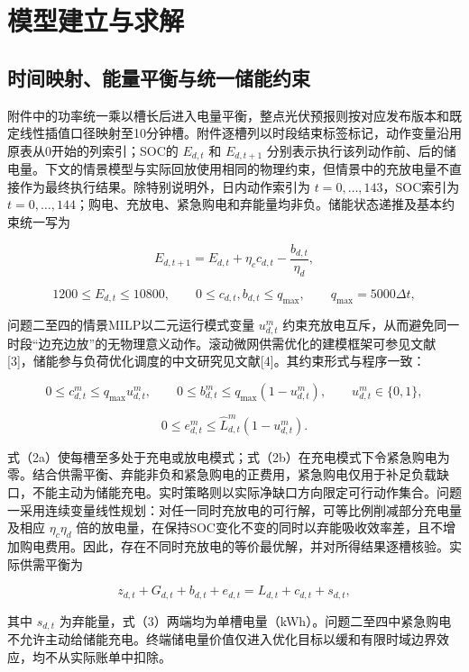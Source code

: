 \documentclass[zihao=-4,a4paper,UTF8,fontset=none]{ctexart}
\begin{document}
\section{模型建立与求解}\label{ux6a21ux578bux5efaux7acbux4e0eux6c42ux89e3}

\subsection{时间映射、能量平衡与统一储能约束}\label{ux65f6ux95f4ux6620ux5c04ux80fdux91cfux5e73ux8861ux4e0eux7edfux4e00ux50a8ux80fdux7ea6ux675f}

附件中的功率统一乘以槽长后进入电量平衡，整点光伏预报则按对应发布版本和既定线性插值口径映射至10分钟槽。附件逐槽列以时段结束标签标记，动作变量沿用原表从0开始的列索引；SOC的 \(E_{d,t}\) 和 \(E_{d,t+1}\) 分别表示执行该列动作前、后的储电量。下文的情景模型与实际回放使用相同的物理约束，但情景中的充放电量不直接作为最终执行结果。除特别说明外，日内动作索引为 \(t=0,\ldots,143\)，SOC索引为 \(t=0,\ldots,144\)；购电、充放电、紧急购电和弃能量均非负。储能状态递推及基本约束统一写为

\[
E_{d,t+1}=E_{d,t}+\eta_c c_{d,t}-\frac{b_{d,t}}{\eta_d},
\tag{1}
\]

\[
1200\le E_{d,t}\le10800,\qquad 0\le c_{d,t},b_{d,t}\le q_{\max},\qquad q_{\max}=5000\Delta t,
\tag{2}
\]

问题二至四的情景MILP以二元运行模式变量 \(u_{d,t}^m\) 约束充放电互斥，从而避免同一时段``边充边放''的无物理意义动作。滚动微网供需优化的建模框架可参见文献{[}3{]}，储能参与负荷优化调度的中文研究见文献{[}4{]}。其约束形式与程序一致：

\[
0\le c_{d,t}^m\le q_{\max}u_{d,t}^m,\qquad
0\le b_{d,t}^m\le q_{\max}(1-u_{d,t}^m),\qquad
u_{d,t}^m\in\{0,1\},
\tag{2a}
\]

\[
0\le e_{d,t}^m\le \widehat L_{d,t}^m(1-u_{d,t}^m).
\tag{2b}
\]

式（2a）使每槽至多处于充电或放电模式；式（2b）在充电模式下令紧急购电为零。结合供需平衡、弃能非负和紧急购电的正费用，紧急购电仅用于补足负载缺口，不能主动为储能充电。实时策略则以实际净缺口方向限定可行动作集合。问题一采用连续变量线性规划：对任一同时充放电的可行解，可等比例削减部分充电量及相应 \(\eta_c\eta_d\) 倍的放电量，在保持SOC变化不变的同时以弃能吸收效率差，且不增加购电费用。因此，存在不同时充放电的等价最优解，并对所得结果逐槽核验。实际供需平衡为

\[
z_{d,t}+G_{d,t}+b_{d,t}+e_{d,t}=L_{d,t}+c_{d,t}+s_{d,t},
\tag{3}
\]

其中 \(s_{d,t}\) 为弃能量，式（3）两端均为单槽电量（kWh）。问题二至四中紧急购电不允许主动给储能充电。终端储电量价值仅进入优化目标以缓和有限时域边界效应，均不从实际账单中扣除。
\end{document}
